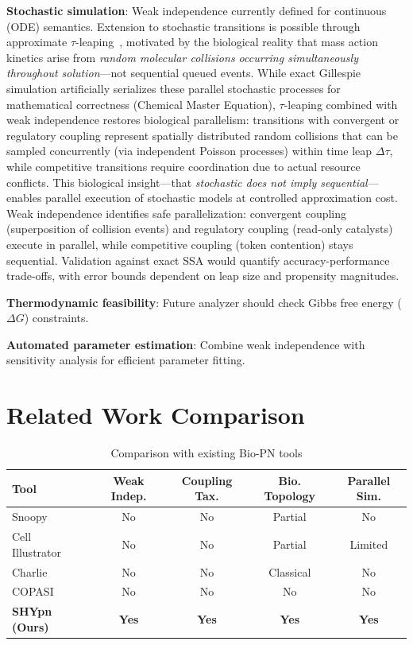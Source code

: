 \documentclass[runningheads]{llncs}
\begin{document}
\textbf{Stochastic simulation}: Weak independence currently defined for continuous (ODE) semantics. Extension to stochastic transitions is possible through approximate $\tau$-leaping~\cite{Gillespie2001}, motivated by the biological reality that mass action kinetics arise from \emph{random molecular collisions occurring simultaneously throughout solution}---not sequential queued events. While exact Gillespie simulation artificially serializes these parallel stochastic processes for mathematical correctness (Chemical Master Equation), $\tau$-leaping combined with weak independence restores biological parallelism: transitions with convergent or regulatory coupling represent spatially distributed random collisions that can be sampled concurrently (via independent Poisson processes) within time leap $\Delta\tau$, while competitive transitions require coordination due to actual resource conflicts. This biological insight---that \emph{stochastic does not imply sequential}---enables parallel execution of stochastic models at controlled approximation cost. Weak independence identifies safe parallelization: convergent coupling (superposition of collision events) and regulatory coupling (read-only catalysts) execute in parallel, while competitive coupling (token contention) stays sequential. Validation against exact SSA would quantify accuracy-performance trade-offs, with error bounds dependent on leap size and propensity magnitudes.

\textbf{Thermodynamic feasibility}: Future analyzer should check Gibbs free energy ($\Delta G$) constraints.

\textbf{Automated parameter estimation}: Combine weak independence with sensitivity analysis for efficient parameter fitting.

\section{Related Work Comparison}

\begin{table}[t]
\centering
\caption{Comparison with existing Bio-PN tools}
\label{tab:comparison}
\begin{tabular}{lcccc}
\toprule
\textbf{Tool} & \textbf{Weak Indep.} & \textbf{Coupling Tax.} & \textbf{Bio. Topology} & \textbf{Parallel Sim.} \\
\midrule
Snoopy~\cite{Heiner2015} & No & No & Partial & No \\
Cell Illustrator~\cite{Nagasaki2011} & No & No & Partial & Limited \\
Charlie~\cite{Heiner2009} & No & No & Classical & No \\
COPASI~\cite{Hoops2006} & No & No & No & No \\
\textbf{SHYpn (Ours)} & \textbf{Yes} & \textbf{Yes} & \textbf{Yes} & \textbf{Yes} \\
\bottomrule
\end{tabular}
\end{table}
\end{document}
